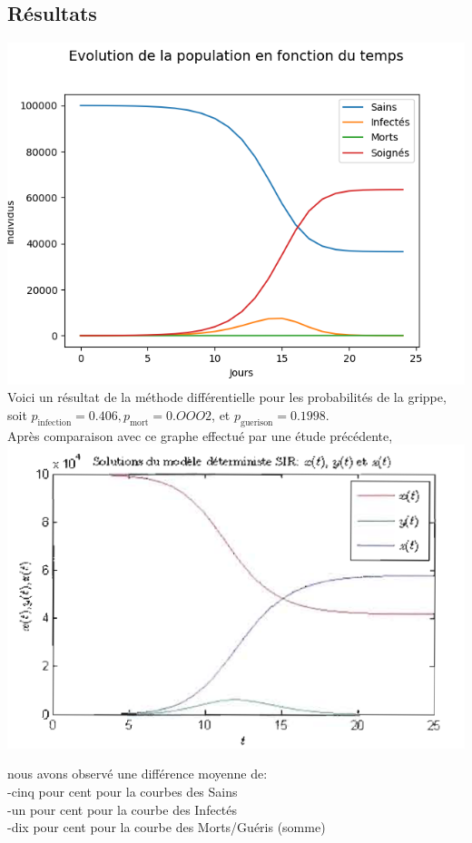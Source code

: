 \documentclass{article}
\begin{document}
\subsection{Résultats}
\includegraphics[scale=1]{../images/diff_grippe.png}
	Voici un résultat de la méthode différentielle pour les probabilités de la grippe, soit $p_{\text{infection}} = 0.406, p_{\text{mort}} = 0.OOO2$, et $p_{\text{guerison}} = 0.1998$. \\
	Après comparaison avec ce graphe effectué par une étude précédente,\\
\includegraphics[scale=01]{../images/diff_comp_article.png}

nous avons observé une différence moyenne de:\\
	-cinq pour cent pour la courbes des Sains\\
	-un pour cent pour la courbe des Infectés\\
	-dix pour cent pour la courbe des Morts/Guéris (somme)
\end{document}
